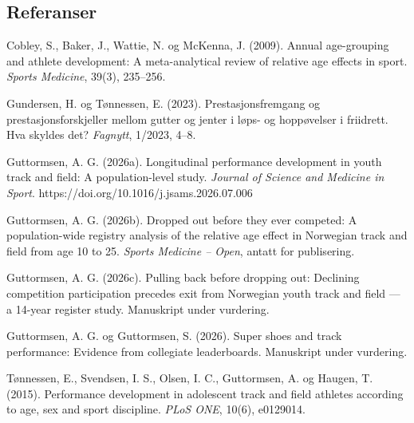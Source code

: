 \subsection{Referanser}\label{referanser}

\begin{referanser}

Cobley, S., Baker, J., Wattie, N. og McKenna, J. (2009). Annual age-grouping
and athlete development: A meta-analytical review of relative age effects in
sport. \emph{Sports Medicine}, 39(3), 235--256.

Gundersen, H. og Tønnessen, E. (2023). Prestasjonsfremgang og
prestasjonsforskjeller mellom gutter og jenter i løps- og hoppøvelser i
friidrett. Hva skyldes det? \emph{Fagnytt}, 1/2023, 4--8.

Guttormsen, A. G. (2026a). Longitudinal performance development in youth
track and field: A population-level study. \emph{Journal of Science and Medicine
in Sport}. https://doi.org/10.1016/j.jsams.2026.07.006

Guttormsen, A. G. (2026b). Dropped out before they ever competed: A
population-wide registry analysis of the relative age effect in Norwegian
track and field from age 10 to 25. \emph{Sports Medicine -- Open}, antatt for
publisering.

Guttormsen, A. G. (2026c). Pulling back before dropping out: Declining
competition participation precedes exit from Norwegian youth track and field
--- a 14-year register study. Manuskript under vurdering.

Guttormsen, A. G. og Guttormsen, S. (2026). Super shoes and track
performance: Evidence from collegiate leaderboards. Manuskript under
vurdering.

Tønnessen, E., Svendsen, I. S., Olsen, I. C., Guttormsen, A. og Haugen, T.
(2015). Performance development in adolescent track and field athletes
according to age, sex and sport discipline. \emph{PLoS ONE}, 10(6), e0129014.

\end{referanser}
